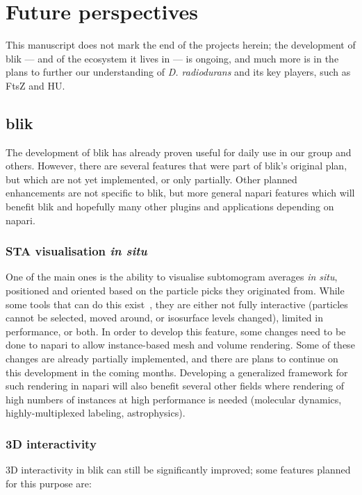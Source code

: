 \chapter{Future perspectives}\label{future}

This manuscript does not mark the end of the projects herein; the development of blik --- and of the ecosystem it lives in --- is ongoing, and much more is in the plans to further our understanding of \textit{D. radiodurans} and its key players, such as FtsZ and HU.

\localtableofcontents

\section{blik}

The development of blik has already proven useful for daily use in our group and others.
However, there are several features that were part of blik's original plan, but which are not yet implemented, or only partially.
Other planned enhancements are not specific to blik, but more general napari features which will benefit blik and hopefully many other plugins and applications depending on napari.

\subsection{STA visualisation \textit{in situ}}
One of the main ones is the ability to visualise subtomogram averages \textit{in situ}, positioned and oriented based on the particle picks they originated from.
While some tools that can do this exist~\cite{ermelArtiaXElectronTomography2022}, they are either not fully interactive (particles cannot be selected, moved around, or isosurface levels changed), limited in performance, or both.
In order to develop this feature, some changes need to be done to napari to allow instance-based mesh and volume rendering.
Some of these changes are already partially implemented, and there are plans to continue on this development in the coming months.
Developing a generalized framework for such rendering in napari will also benefit several other fields where rendering of high numbers of instances at high performance is needed (molecular dynamics, highly-multiplexed labeling, astrophysics).

\subsection{3D interactivity}
3D interactivity in blik can still be significantly improved; some features planned for this purpose are:

